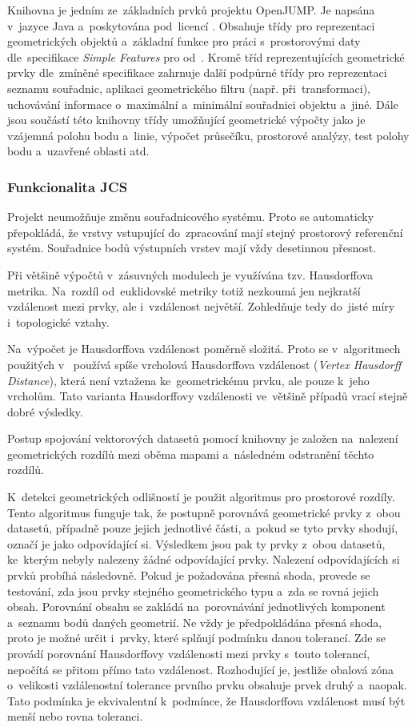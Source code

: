 Knihovna  je jedním ze~základních prvků projektu OpenJUMP.
Je napsána v~jazyce Java a~poskytována pod~licencí . Obsahuje třídy 
pro reprezentaci geometrických objektů a~základní funkce pro práci 
s~prostorovými daty dle~specifikace \textit{Simple Features} pro  
od~. Kromě tříd reprezentujících geometrické prvky dle~zmíněné
specifikace zahrnuje další podpůrné třídy pro reprezentaci seznamu souřadnic,
aplikaci geometrického filtru (např. při~transformaci), uchovávání informace
o~maximální a~minimální souřadnici objektu a~jiné. Dále jsou součástí této 
knihovny třídy umožňující geometrické výpočty jako je vzájemná polohu bodu 
a~linie, výpočet průsečíku, prostorové analýzy, test polohy bodu a~uzavřené
oblasti atd. 

\subsubsection{Funkcionalita JCS}
\label{jcs-funkcionalita}

Projekt  neumožňuje změnu souřadnicového systému. Proto se
automaticky přepokládá, že vrstvy vstupující do~zpracování mají stejný
prostorový referenční systém. Souřadnice bodů výstupních vrstev mají vždy
desetinnou přesnost.

Při většině výpočtů v~zásuvných modulech  je využívána tzv. 
Hausdorffova metrika. Na~rozdíl od~euklidovské metriky totiž nezkoumá jen
nejkratší vzdálenost mezi prvky, ale i~vzdálenost největší.
Zohledňuje tedy do~jisté míry i~topologické vztahy.

Na~výpočet je Hausdorffova vzdálenost poměrně složitá. Proto se v~algoritmech
použi\-tých v~ používá spíše vrcholová Hausdorffova vzdálenost 
(\textit{Vertex Hausdorff Distance}), která není vztažena ke~geometrickému 
prvku, ale pouze k~jeho vrcholům. Tato varianta Hausdorffovy vzdálenosti 
ve~většině případů vrací stejně dobré výsledky.

Postup spojování vektorových datasetů pomocí knihovny  je založen
na~na\-le\-zení geometrických rozdílů mezi oběma mapami a~následném odstranění 
těchto rozdílů.

K~detekci geometrických odlišností je použit algoritmus pro prostorové rozdíly.
Tento algoritmus funguje tak, že postupně porovnává geometrické prvky z~obou 
datasetů, případně pouze jejich jednotlivé části, a~pokud se tyto prvky shodují,
ozna\-čí je jako odpovídající si. Výsledkem jsou pak ty prvky z~obou datasetů, 
ke~kterým nebyly nalezeny žádné odpovídající prvky. Nalezení odpovídajících si
prvků probíhá následovně. Pokud je požadována přesná shoda, provede se 
testování, zda jsou prvky stejného geometrického typu a~zda se rovná jejich 
obsah. Porovnání obsahu se za\-kládá na~porovnávání jednotlivých komponent 
a~seznamu bodů daných geometrií. Ne vždy je předpokládána přesná shoda,
proto je možné určit i~prvky, které splňují podmínku danou tolerancí. Zde se
provádí porovnání Hausdorffovy vzdálenosti mezi prvky s~touto tolerancí, 
nepočítá se přitom přímo tato vzdálenost. Rozhodující je, jestliže obalová 
zóna o~velikosti vzdálenostní tolerance prvního prvku obsahuje prvek druhý 
a~naopak. Tato podmínka je ekvivalentní k~podmínce, že Hausdorffova vzdálenost
musí být menší nebo rovna toleranci. 

